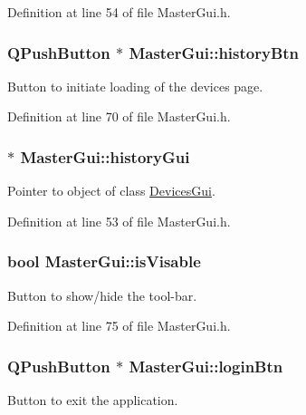 Definition at line 54 of file Master\-Gui.\-h.

\hypertarget{class_master_gui_ac1e5c7696dd0b13ba583acc051e25b6f}{
\subsubsection[{history\-Btn}]{\setlength{\rightskip}{0pt plus 5cm}Q\-Push\-Button $\ast$ Master\-Gui\-::history\-Btn\hspace{0.3cm}{\ttfamily [private]}}}\label{class_master_gui_ac1e5c7696dd0b13ba583acc051e25b6f}
Button to initiate loading of the devices page. 

Definition at line 70 of file Master\-Gui.\-h.

\hypertarget{class_master_gui_a586f326835930b130a4263c703468f58}{
\subsubsection[{history\-Gui}]{ $\ast$ Master\-Gui\-::history\-Gui\hspace{0.3cm}{\ttfamily [private]}}}\label{class_master_gui_a586f326835930b130a4263c703468f58}
Pointer to object of class \hyperlink{class_devices_gui}{Devices\-Gui}. 

Definition at line 53 of file Master\-Gui.\-h.

\hypertarget{class_master_gui_af333eea410d23010b21377518a336c04}{
\subsubsection[{is\-Visable}]{\setlength{\rightskip}{0pt plus 5cm}bool Master\-Gui\-::is\-Visable\hspace{0.3cm}{\ttfamily [private]}}}\label{class_master_gui_af333eea410d23010b21377518a336c04}
Button to show/hide the tool-\/bar. 

Definition at line 75 of file Master\-Gui.\-h.

\hypertarget{class_master_gui_a5bc5b77413591b0b8fb9021062982ca3}{
\subsubsection[{login\-Btn}]{\setlength{\rightskip}{0pt plus 5cm}Q\-Push\-Button $\ast$ Master\-Gui\-::login\-Btn\hspace{0.3cm}{\ttfamily [private]}}}\label{class_master_gui_a5bc5b77413591b0b8fb9021062982ca3}
Button to exit the application. 

